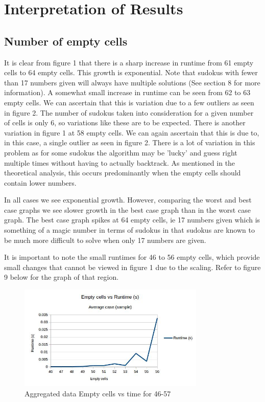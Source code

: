 \documentclass{article}
\begin{document}
\newpage

\section{Interpretation of Results}
\subsection{Number of empty cells}
It is clear from figure 1 that there is a sharp increase in runtime from 61 empty cells to 64 empty cells. This growth is exponential. Note that sudokus with fewer than 17 numbers given will always have multiple solutions (See section 8 for more information). A somewhat small increase in runtime can be seen from 62 to 63 empty cells. We can ascertain that this is variation due to a few outliers as seen in figure 2. The number of sudokus taken into consideration for a given number of cells is only 6, so variations like these are to be expected. There is another variation in figure 1 at 58 empty cells. We can again ascertain that this is due to, in this case, a single outlier as seen in figure 2. There is a lot of variation in this problem as for some sudokus the algorithm may be 'lucky' and guess right multiple times without having to actually backtrack. As mentioned in the theoretical analysis, this occurs predominantly when the empty cells should contain lower numbers.

In all cases we see exponential growth. However, comparing the worst and best case graphs we see slower growth in the best case graph than in the worst case graph. The best case graph spikes at 64 empty cells, ie 17 numbers given which is something of a magic number in terms of sudokus in that sudokus are known to be much more difficult to solve when only 17 numbers are given.

It is important to note the small runtimes for 46 to 56 empty cells, which provide small changes that cannot be viewed in figure 1 due to the scaling. Refer to figure 9 below for the graph of that region.

\begin{figure}[H]
	\includegraphics[width=0.9\linewidth, height=5cm]{graphs_outputs/EmptycellsVSTimeAverage(Sample).jpg}
	\caption{Aggregated data Empty cells vs time for 46-57}
\end{figure}
\end{document}
